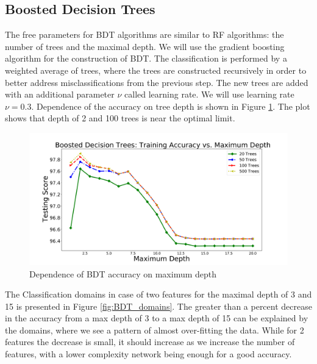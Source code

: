 \subsection{Boosted Decision Trees}

The free parameters for BDT algorithms are similar to RF algorithms: the number of trees and the maximal depth.
We will use the gradient boosting algorithm for the construction of BDT.
The classification is performed by a weighted average of trees, where the trees are constructed recursively in order to better address 
misclassifications from the previous step. The new trees are added with an additional parameter $\nu$ called learning rate.
We will use learning rate $\nu = 0.3$.
Dependence of the accuracy on tree depth is shown in Figure \ref{fig:BDT_depth}. The plot shows that depth of 2 and 100 trees is near the optimal limit. 

\begin{figure}[h]
\includegraphics[width=\twopicsp\textwidth]{plots/bdt_train.pdf}
\caption{Dependence of BDT accuracy on maximum depth}
\label{fig:BDT_depth}
\end{figure}

The Classification domains in case of two features for the maximal depth of 3 and 15 is presented in Figure \ref{fig:BDT_domains}. The greater than a percent decrease in the accuracy from a max depth of 3 to a max depth of 15 can be explained by the domains, where we see a pattern of almost over-fitting the data. While for 2 features the decrease is small, it should increase as we increase the number of features, with a lower complexity network being enough for a good accuracy.

